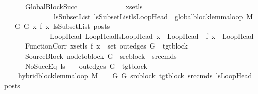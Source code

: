 \begin{isabellebody}
\ \ \ \ \ \ \ GlobalBlockSucc{\isacharcolon}{\kern0pt}\ \isanewline
\ \ \ \ \ \ \ \ \ \ \ \ {\isachardoublequoteopen}{\isasymforall}x{\isasymin}set{\isacharparenleft}{\kern0pt}ls{\isacharparenright}{\kern0pt}{\isachardot}{\kern0pt}\isanewline
\ \ \ \ \ \ \ \ \ \ \ \ \ \ \ {\isacharparenleft}{\kern0pt}{\isasymexists}lsSubsetList{\isachardot}{\kern0pt}\ lsSubsetList{\isasymsubseteq}lsLoopHead\ {\isasymand}\ global{\isacharunderscore}{\kern0pt}block{\isacharunderscore}{\kern0pt}lemma{\isacharunderscore}{\kern0pt}loop\ M\ {\isasymLambda}\ {\isasymGamma}\ {\isasymOmega}\ G\ G{\isacharprime}{\kern0pt}\ x\ {\isacharparenleft}{\kern0pt}f\ x{\isacharparenright}{\kern0pt}\ lsSubsetList\ posts{\isacharparenright}{\kern0pt}\ \isanewline
\ \ \ \ \ \ \ \ \ \ \ \ \ {\isasymor}\ {\isacharparenleft}{\kern0pt}{\isasymexists}{\isacharparenleft}{\kern0pt}LoopHead{\isacharcomma}{\kern0pt}\ LoopHead{\isacharprime}{\kern0pt}{\isacharparenright}{\kern0pt}{\isasymin}lsLoopHead{\isachardot}{\kern0pt}\ {\isacharparenleft}{\kern0pt}x\ {\isacharequal}{\kern0pt}\ LoopHead\ {\isasymand}\ f\ x\ {\isacharequal}{\kern0pt}\ LoopHead{\isacharprime}{\kern0pt}{\isacharparenright}{\kern0pt}{\isacharparenright}{\kern0pt}{\isachardoublequoteclose}\isanewline
\ \ \ \ \ \ \ FunctionCorr{\isacharcolon}{\kern0pt}\ {\isachardoublequoteopen}{\isasymforall}x{\isasymin}set{\isacharparenleft}{\kern0pt}ls{\isacharparenright}{\kern0pt}{\isachardot}{\kern0pt}\ f\ x\ {\isasymin}\ set\ {\isacharparenleft}{\kern0pt}out{\isacharunderscore}{\kern0pt}edges\ G{\isacharprime}{\kern0pt}\ {\isacharbang}{\kern0pt}\ tgt{\isacharunderscore}{\kern0pt}block{\isacharparenright}{\kern0pt}{\isachardoublequoteclose}\isanewline
\ \ \ \ \ \ \ SourceBlock{\isacharcolon}{\kern0pt}\ {\isachardoublequoteopen}node{\isacharunderscore}{\kern0pt}to{\isacharunderscore}{\kern0pt}block\ G\ {\isacharbang}{\kern0pt}\ src{\isacharunderscore}{\kern0pt}block\ {\isacharequal}{\kern0pt}\ src{\isacharunderscore}{\kern0pt}cmds{\isachardoublequoteclose}\isanewline
\ \ \ \ \ \ \ NoSuccEq{\isacharcolon}{\kern0pt}\ {\isachardoublequoteopen}ls\ {\isacharequal}{\kern0pt}\ {\isacharbrackleft}{\kern0pt}{\isacharbrackright}{\kern0pt}\ {\isasymLongrightarrow}\ out{\isacharunderscore}{\kern0pt}edges\ G{\isacharprime}{\kern0pt}\ {\isacharbang}{\kern0pt}\ tgt{\isacharunderscore}{\kern0pt}block\ {\isacharequal}{\kern0pt}\ {\isacharbrackleft}{\kern0pt}{\isacharbrackright}{\kern0pt}{\isachardoublequoteclose}\isanewline
\ \ \ \ \ {\isachardoublequoteopen}hybrid{\isacharunderscore}{\kern0pt}block{\isacharunderscore}{\kern0pt}lemma{\isacharunderscore}{\kern0pt}loop\ M\ {\isasymLambda}\ {\isasymGamma}\ {\isasymOmega}\ G\ G{\isacharprime}{\kern0pt}\ src{\isacharunderscore}{\kern0pt}block\ tgt{\isacharunderscore}{\kern0pt}block\ src{\isacharunderscore}{\kern0pt}cmds\ lsLoopHead\ posts{\isachardoublequoteclose}\isanewline

\end{isabellebody}
